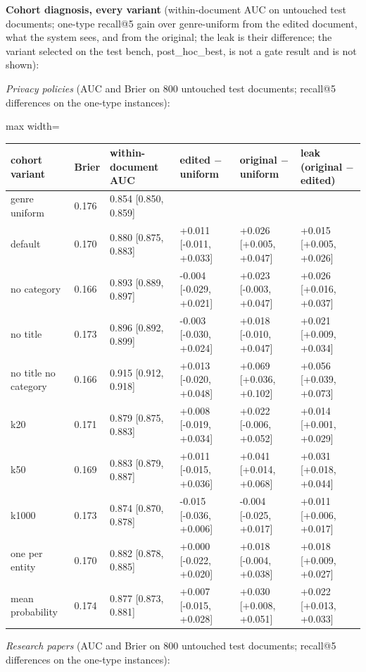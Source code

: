 \documentclass[11pt,a4paper]{article}
\newcommand{\panel}[1]{\par\medskip\noindent #1\par\smallskip}
\begin{document}
\begin{table}[H]
\centering\small
\panel{\textbf{Cohort diagnosis, every variant} (within-document AUC on untouched test documents; one-type recall@5 gain over genre-uniform from the edited document, what the system sees, and from the original; the leak is their difference; the variant selected on the test bench, post\_hoc\_best, is not a gate result and is not shown):}
\panel{\emph{Privacy policies} (AUC and Brier on 800 untouched test documents; recall@5 differences on the one-type instances):}
\begin{adjustbox}{max width=\linewidth}
\begin{tabular}{llllll}
\toprule
cohort variant & Brier & within-document AUC & edited $-$ uniform & original $-$ uniform & leak (original $-$ edited) \\
\midrule
genre uniform & 0.176 & 0.854 [0.850, 0.859] &  &  &  \\
default & 0.170 & 0.880 [0.875, 0.883] & +0.011 [-0.011, +0.033] & +0.026 [+0.005, +0.047] & +0.015 [+0.005, +0.026] \\
no category & 0.166 & 0.893 [0.889, 0.897] & -0.004 [-0.029, +0.021] & +0.023 [-0.003, +0.047] & +0.026 [+0.016, +0.037] \\
no title & 0.173 & 0.896 [0.892, 0.899] & -0.003 [-0.030, +0.024] & +0.018 [-0.010, +0.047] & +0.021 [+0.009, +0.034] \\
no title no category & 0.166 & 0.915 [0.912, 0.918] & +0.013 [-0.020, +0.048] & +0.069 [+0.036, +0.102] & +0.056 [+0.039, +0.073] \\
k20 & 0.171 & 0.879 [0.875, 0.883] & +0.008 [-0.019, +0.034] & +0.022 [-0.006, +0.052] & +0.014 [+0.001, +0.029] \\
k50 & 0.169 & 0.883 [0.879, 0.887] & +0.011 [-0.015, +0.036] & +0.041 [+0.014, +0.068] & +0.031 [+0.018, +0.044] \\
k1000 & 0.173 & 0.874 [0.870, 0.878] & -0.015 [-0.036, +0.006] & -0.004 [-0.025, +0.017] & +0.011 [+0.006, +0.017] \\
one per entity & 0.170 & 0.882 [0.878, 0.885] & +0.000 [-0.022, +0.020] & +0.018 [-0.004, +0.038] & +0.018 [+0.009, +0.027] \\
mean probability & 0.174 & 0.877 [0.873, 0.881] & +0.007 [-0.015, +0.028] & +0.030 [+0.008, +0.051] & +0.022 [+0.013, +0.033] \\
\bottomrule
\end{tabular}
\end{adjustbox}
\panel{\emph{Research papers} (AUC and Brier on 800 untouched test documents; recall@5 differences on the one-type instances):}

\end{table}
\end{document}
